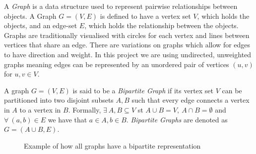 \documentclass[11pt,twoside,a4paper]{report}
\begin{document}
A \textit{Graph} is a data structure used to represent pairwise relationships between objects. A Graph $G=(V,E)$ is defined to have a vertex set $V$, which holds the objects, and an edge-set $E$, which holds the relationship between the objects. Graphs are traditionally visualised with circles for each vertex and lines between vertices that share an edge. There are variations on graphs which allow for edges to have direction and weight. In this project we are using undirected, unweighted graphs meaning edges can be represented by an unordered pair of vertices $(u,v)$ for $u,v\in V$.

\par A graph $G=(V,E)$ is said to be a \textit{Bipartite Graph} if its vertex set $V$ can be partitioned into two disjoint subsets $A,B$ such that every edge connects a vertex in $A$ to a vertex in $B$. Formally, $\exists\ A,B\subseteq V$ st $A\cup B=V,\ A\cap B=\emptyset$ and $\forall\ (a,b)\in E$ we have that $a\in A,b\in B$. \textit{Bipartite Graphs} are denoted as $G=(A\cup B,E)$.

\begin{figure}[H]
	\centering
	\qquad
	\caption{Example of how all graphs have a bipartite representation}
	\label{Figure 0}
\end{figure}
\end{document}

